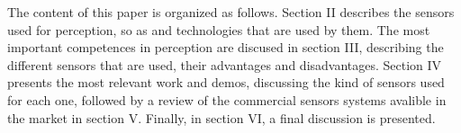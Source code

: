 The content of this paper is organized as follows. Section II describes the sensors used for perception, so as and technologies that are used by them. The most important competences in perception are discused in section III, describing the different sensors that are used, their advantages and disadvantages. Section IV presents the most relevant work and demos, discussing the kind of sensors used for each one, followed by a review of the commercial sensors systems avalible in the market in section V. Finally, in section VI, a final discussion is presented. 
